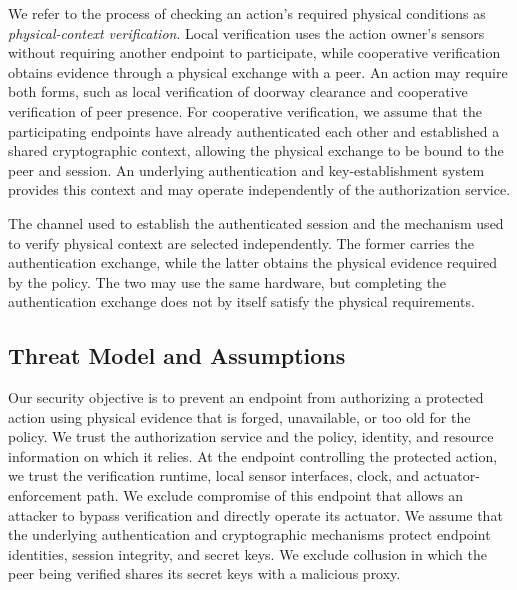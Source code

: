 \documentclass[sigconf,authordraft]{acmart}
\begin{document}
We refer to the process of checking an action's required physical conditions as \emph{physical-context verification}.
Local verification uses the action owner's sensors without requiring another endpoint to participate, while cooperative verification obtains evidence through a physical exchange with a peer.
An action may require both forms, such as local verification of doorway clearance and cooperative verification of peer presence.
For cooperative verification, we assume that the participating endpoints have already authenticated each other and established a shared cryptographic context, allowing the physical exchange to be bound to the peer and session.
An underlying authentication and key-establishment system provides this context and may operate independently of the authorization service.

The channel used to establish the authenticated session and the mechanism used to verify physical context are selected independently.
The former carries the authentication exchange, while the latter obtains the physical evidence required by the policy.
The two may use the same hardware, but completing the authentication exchange does not by itself satisfy the physical requirements.


\subsection{Threat Model and Assumptions}
\label{sec:threat-model}



Our security objective is to prevent an endpoint from authorizing a protected action using physical evidence that is forged, unavailable, or too old for the policy.
We trust the authorization service and the policy, identity, and resource information on which it relies.
At the endpoint controlling the protected action, we trust the verification runtime, local sensor interfaces, clock, and actuator-enforcement path.
We exclude compromise of this endpoint that allows an attacker to bypass verification and directly operate its actuator.
We assume that the underlying authentication and cryptographic mechanisms protect endpoint identities, session integrity, and secret keys.
We exclude collusion in which the peer being verified shares its secret keys with a malicious proxy.
\end{document}
